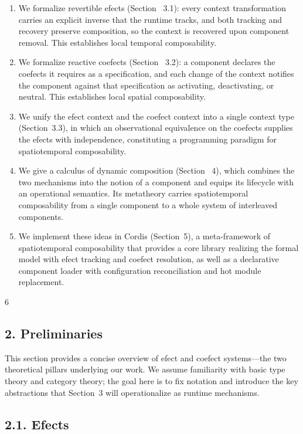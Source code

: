 \documentclass[
  10
]{article}
\begin{document}
\begin{enumerate}
\def\labelenumi{\arabic{enumi}.}
\item
  We formalize revertible efects (Section~ 3.1): every context
  transformation carries an explicit inverse that the runtime tracks,
  and both tracking and recovery preserve composition, so the context is
  recovered upon component removal. This establishes local temporal
  composability.
\item
  We formalize reactive coefects (Section~ 3.2): a component declares
  the coefects it requires as a specification, and each change of the
  context notifies the component against that specification as
  activating, deactivating, or neutral. This establishes local spatial
  composability.
\item
  We unify the efect context and the coefect context into a single
  context type (Section~3.3), in which an observational equivalence on
  the coefects supplies the efects with independence, constituting a
  programming paradigm for spatiotemporal composability.
\item
  We give a calculus of dynamic composition (Section~ 4), which combines
  the two mechanisms into the notion of a component and equips its
  lifecycle with an operational semantics. Its metatheory carries
  spatiotemporal composability from a single component to a whole system
  of interleaved components.
\item
  We implement these ideas in Cordis (Section~5), a meta-framework of
  spatiotemporal composability that provides a core library realizing
  the formal model with efect tracking and coefect resolution, as well
  as a declarative component loader with configuration reconciliation
  and hot module replacement.
\end{enumerate}

6

\subsection{2. Preliminaries}\label{preliminaries}

This section provides a concise overview of efect and coefect
systems---the two theoretical pillars underlying our work. We assume
familiarity with basic type theory and category theory; the goal here is
to fix notation and introduce the key abstractions that Section~3 will
operationalize as runtime mechanisms.

\subsection{2.1. Efects}\label{efects}
\end{document}
